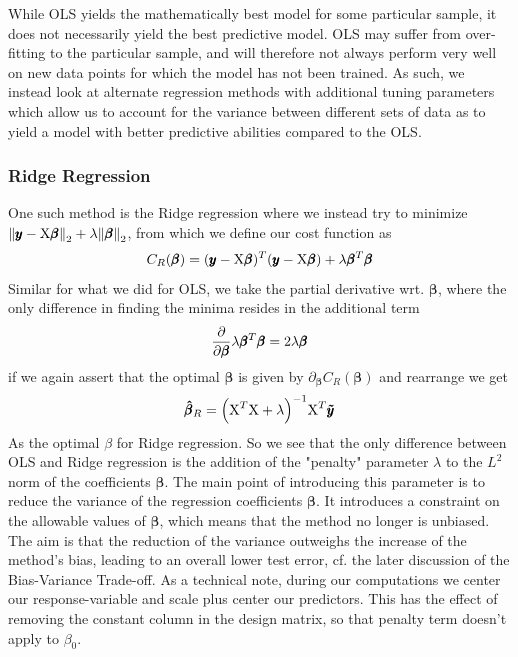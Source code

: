 \documentclass[reprint, english, nofootinbib]{revtex4-2}
\begin{document}
            While OLS yields the mathematically best model for some particular sample, it does not necessarily yield the best predictive model. OLS may suffer from over-fitting to the particular sample, and will therefore not always perform very well on new data points for which the model has not been trained. As such, we instead look at alternate regression methods with additional tuning parameters which allow us to account for the variance between different sets of data as to yield a model with better predictive abilities compared to the OLS.

        \subsubsection{Ridge Regression}
            \noindent
            One such method is the Ridge regression where we instead try to minimize $\norm{\pmb y - \textup{X}\pmb \beta}_2 + \lambda\norm{\pmb \beta}_2$, from which we define our cost function as
            \begin{equation}
                C_{R}(\pmb \beta)
                = (\pmb y - \textup{X}\pmb\beta)^T(\pmb y - \textup{X}\pmb\beta)
                + \lambda \pmb\beta^T\pmb\beta
            \end{equation}
            Similar for what we did for OLS, we take the partial derivative wrt. $\pmb \beta$, where the only difference in finding the minima resides in the additional term
            \begin{equation}
                \pdv{\pmb \beta} \lambda \pmb\beta^T\pmb\beta = 2\lambda\pmb\beta
            \end{equation}
            if we again assert that the optimal $\pmb\beta$ is given by $\partial_{\pmb\beta}C_R(\pmb\beta)$ and rearrange we get
            \begin{equation}
                \pmb{\hat\beta}_R = \qty(\textup{X}^T\textup{X}  + \lambda)^{-1}\textup{X}^T\pmb{\tilde y}
            \end{equation}
            As the optimal $\beta$ for Ridge regression.
            So we see that the only difference between OLS and Ridge regression is the addition of the "penalty" parameter $\lambda$ to the $L^2$ norm of the coefficients $\pmb{\beta}$. The main point of introducing this parameter is to reduce the variance of the regression coefficients $\pmb{\beta}$. It introduces a constraint on the allowable values of $\pmb{\beta}$, which means that the method no longer is unbiased. The aim is that the reduction of the variance outweighs the increase of the method's bias, leading to an overall lower test error, cf. the later discussion of the Bias-Variance Trade-off. As a technical note, during our computations we center our response-variable and scale plus center our predictors. This has the effect of removing the constant column in the design matrix, so that penalty term doesn't apply to $\beta_{0}$.
\end{document}

